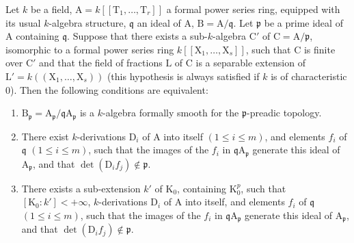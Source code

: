 \begin{proposition}[22.7.2]
\label{0.22.7.2}
Let $k$ be a field, $\mathrm{A}=k[[\mathrm{T}_1,\ldots,\mathrm{T}_r]]$ a formal power series ring, equipped with its usual $k$-algebra structure, $\mathfrak{q}$ an ideal of $\mathrm{A}$, $\mathrm{B}=\mathrm{A}/\mathfrak{q}$.
Let $\mathfrak{p}$ be a prime ideal of $\mathrm{A}$ containing $\mathfrak{q}$.
Suppose that there exists a sub-$k$-algebra $\mathrm{C}'$ of $\mathrm{C}=\mathrm{A}/\mathfrak{p}$, isomorphic to a formal power series ring $k[[\mathrm{X}_1,\ldots,\mathrm{X}_s]]$, such that $\mathrm{C}$ is finite over $\mathrm{C}'$ and that the field of fractions $\mathrm{L}$ of $\mathrm{C}$ is a separable extension of $\mathrm{L}'=k((\mathrm{X}_1,\ldots,\mathrm{X}_s))$ (this hypothesis is always satisfied if $k$ is of characteristic $0$).
Then the following conditions are equivalent:
\begin{enumerate}
  \item[a)] $\mathrm{B}_\mathfrak{p}=\mathrm{A}_\mathfrak{p}/\mathfrak{q}\mathrm{A}_\mathfrak{p}$ is a $k$-algebra formally smooth for the $\mathfrak{p}$-preadic topology.
  \item[b)] There exist $k$-derivations $\mathrm{D}_i$ of $\mathrm{A}$ into itself $(1\leq i\leq m)$, and elements $f_i$ of $\mathfrak{q}$ $(1\leq i\leq m)$, such that the images of the $f_i$ in $\mathfrak{q}\mathrm{A}_\mathfrak{p}$ generate this ideal of $\mathrm{A}_\mathfrak{p}$, and that $\det(\mathrm{D}_if_j)\notin\mathfrak{p}$.
  \item[b')] There exists a sub-extension $k'$ of $\mathrm{K}_0$, containing $\mathrm{K}_0^p$, such that $[\mathrm{K}_0:k']<+\infty$, $k$-derivations $\mathrm{D}_i$ of $\mathrm{A}$ into itself, and elements $f_i$ of $\mathfrak{q}$ $(1\leq i\leq m)$, such that the images of the $f_i$ in $\mathfrak{q}\mathrm{A}_\mathfrak{p}$ generate this ideal of $\mathrm{A}_\mathfrak{p}$, and that $\det(\mathrm{D}_if_j)\notin\mathfrak{p}$.
\end{enumerate}
\end{proposition}

